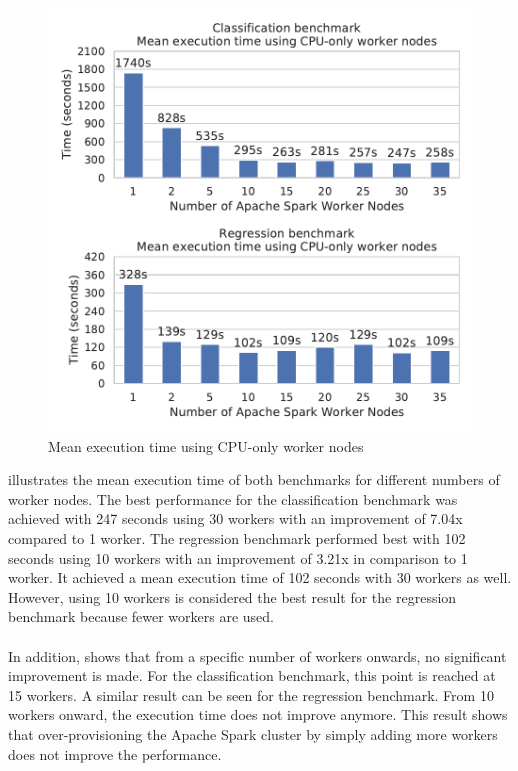 \begin{figure}[h]
\centering
\includegraphics[scale=0.9]{images/07_evaluation/overall_cpu}
\caption{Mean execution time using CPU-only worker nodes}
\label{fig:07_static_results}
\end{figure}
 illustrates the mean execution time of both benchmarks for different numbers of worker nodes.
The best performance for the classification benchmark was achieved with 247 seconds using 30 workers with an improvement of 7.04x compared to 1 worker.
The regression benchmark performed best with 102 seconds using 10 workers with an improvement of 3.21x in comparison to 1 worker. It achieved a mean execution time of 102 seconds with 30 workers as well. However, using 10 workers is considered the best result for the regression benchmark because fewer workers are used.

\paragraph{}
In addition,  shows that from a specific number of workers onwards, no significant improvement is made.
For the classification benchmark, this point is reached at 15 workers.
A similar result can be seen for the regression benchmark. From 10 workers onward, the execution time does not improve anymore.
This result shows that over-provisioning the Apache Spark cluster by simply adding more workers does not improve the performance.


